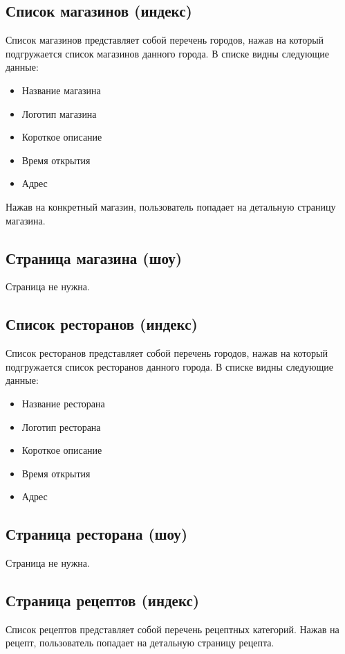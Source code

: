 \documentclass[DIV=calc, paper=a4, fontsize=11pt]{scrartcl} %
\begin{document}
\subsection{Список магазинов (индекс)}
Список магазинов представляет собой перечень городов, нажав на который подгружается список магазинов данного города. В списке видны следующие данные:
\begin{itemize}
	\item Название магазина
	\item Логотип магазина
	\item Короткое описание
	\item Время открытия 
	\item Адрес
\end{itemize}

Нажав на конкретный магазин, пользователь попадает на детальную страницу магазина.

\subsection{Страница магазина (шоу)}
Страница не нужна.

\subsection{Список ресторанов (индекс)}
Список ресторанов представляет собой перечень городов, нажав на который подгружается список ресторанов данного города. В списке видны следующие данные:
\begin{itemize}
	\item Название ресторана
	\item Логотип ресторана
	\item Короткое описание
	\item Время открытия 
	\item Адрес
\end{itemize}

\subsection{Страница ресторана (шоу)}
Страница не нужна.


\subsection{Страница рецептов (индекс)}
Список рецептов представляет собой перечень рецептных категорий. Нажав на рецепт, пользователь попадает на детальную страницу рецепта.
\end{document}
